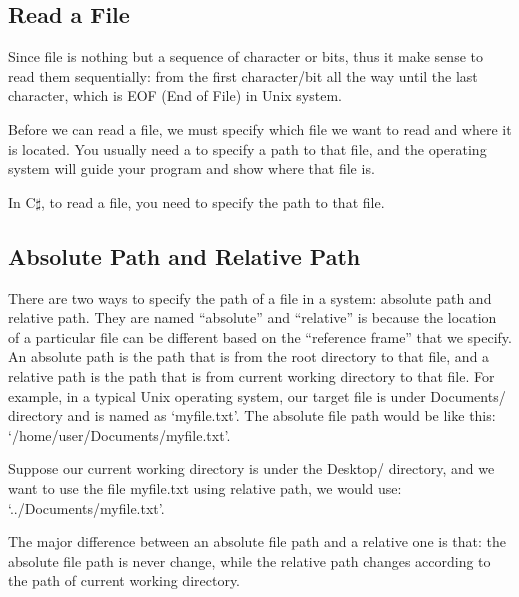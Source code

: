 \documentclass[../main.tex]{subfiles}
\begin{document}
\subsection{Read a File}
Since file is nothing but a sequence of character or bits, thus it make sense to
read them sequentially: from the first character/bit all the way until the last
character, which is EOF (End of File) in Unix system.

Before we can read a file, we must specify which file we want to read and where
it is located. You usually need a to specify a path to that file, and the
operating system will guide your program and show where that file is.

In C$\sharp$, to read a file, you need to specify the path to that file.

\subsection{Absolute Path and Relative Path}
There are two ways to specify the path of a file in a system: absolute path and
relative path. They are named ``absolute'' and ``relative'' is because the location
of a particular file can be different based on the ``reference frame'' that we
specify. An absolute path is the path that is from the root directory to
that file, and a relative path is the path that is from current working directory
to that file. For example, in a typical Unix operating system, our target file is
under Documents/ directory and is named as `myfile.txt'. The absolute file path
would be like this: `/home/user/Documents/myfile.txt'.

Suppose our current working directory is under the Desktop/ directory, and we want
to use the file myfile.txt using relative path, we would use: `../Documents/myfile.txt'.

The major difference between an absolute file path and a relative one is that:
the absolute file path is never change, while the relative path changes according
to the path of current working directory.
\end{document}
